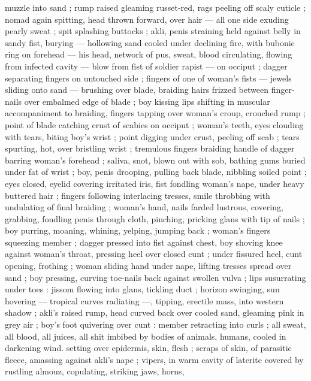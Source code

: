 muzzle into sand ; rump raised gleaming russet-red, rags peeling off 
scaly cuticle ; nomad again spitting, head thrown forward, over hair 
--- all one side exuding pearly sweat ; spit splashing buttocks ; akli, 
penis straining held against belly in sandy fist, burying --- hollowing 
sand cooled under declining fire, with bubonic ring on forehead --- 
his head, network of pus, sweat, blood circulating, flowing from 
infected cavity --- blow from fist of soldier rapist --- on occiput ; 
dagger separating fingers on untouched side ; fingers of one of 
woman's fists --- jewels sliding onto sand --- brushing over blade, 
braiding hairs frizzed between finger-nails over embalmed edge of 
blade ; boy kissing lips shifting in muscular accompaniment to 
braiding, fingers tapping over woman's croup, crouched rump ; point 
of blade catching crust of scabies on occiput ; woman's teeth, eyes 
clouding with tears, biting boy's wrist ; point digging under crust, 
peeling off scab ; tears spurting, hot, over bristling wrist ; tremulous 
fingers braiding handle of dagger barring woman's forehead ; saliva, 
snot, blown out with sob, bathing gums buried under fat of wrist ; 
boy, penis drooping, pulling back blade, nibbling soiled point ; eyes 
closed, eyelid covering irritated iris, fist fondling woman's nape, 
under heavy buttered hair ; fingers following interlacing tresses, 
smile throbbing with undulating of final braiding ; woman's hand, 
nails farded lustrous, covering, grabbing, fondling penis through 
cloth, pinching, pricking glans with tip of nails ; boy purring, 
moaning, whining, yelping, jumping back ; woman's fingers 
squeezing member ; dagger pressed into fist against chest, boy 
shoving knee against woman's throat, pressing heel over closed cunt 
; under fissured heel, cunt opening, frothing ; woman sliding hand 
under nape, lifting tresses spread over sand ; boy pressing, curving 
toe-nails back against swollen vulva ; lips susurrating under toes : 
jissom flowing into glans, tickling duct ; horizon swinging, sun 
hovering --- tropical curves radiating ---, tipping, erectile mass, into 
western shadow ; akli's raised rump, head curved back over cooled 
sand, gleaming pink in grey air ; boy's foot quivering over cunt : 
member retracting into curls ; all sweat, all blood, all juices, all shit 
imbibed by bodies of animals, humans, cooled in darkening wind. 
setting over epidermis, skin, flesh ; scraps of skin, of parasitic 
fleece, amassing against akli's nape ; vipers, in warm cavity of 
laterite covered by rustling almouz, copulating, striking jaws, horns, 
